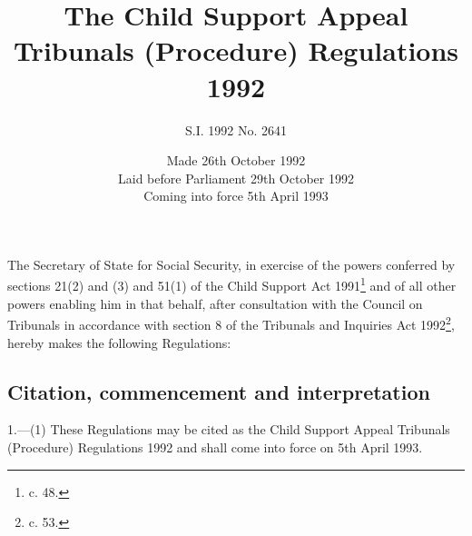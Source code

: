 \documentclass[a4paper]{article}
\title{The Child Support Appeal Tribunals (Procedure) Regulations 1992}
\author{S.I. 1992 No. 2641}
\date{Made 26th October 1992\\Laid before Parliament 29th October 1992\\Coming into force 5th April 1993}
\begin{document}
\maketitle

\noindent
The Secretary of State for Social Security, in exercise of the powers conferred by sections 21(2) and (3) and 51(1) of the Child Support Act 1991\footnote{ c. 48.} and of all other powers enabling him in that behalf, after consultation with the Council on Tribunals in accordance with section 8 of the Tribunals and Inquiries Act 1992\footnote{ c. 53.}, hereby makes the following Regulations:

{\sloppy

\tableofcontents

}

\setcounter{secnumdepth}{-2}

\subsection[1. Citation, commencement and interpretation]{Citation, commencement and interpretation}

1.—(1) These Regulations may be cited as the Child Support Appeal Tribunals (Procedure) Regulations 1992 and shall come into force on 5th April 1993.
\end{document}
